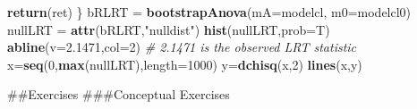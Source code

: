 \documentclass[
]{krantz}
\newenvironment{Shaded}{\begin{snugshade}}{\end{snugshade}}
\newcommand{\CommentTok}[1]{\textcolor[rgb]{0.37,0.37,0.37}{\textit{#1}}}
\newcommand{\DataTypeTok}[1]{\textcolor[rgb]{0.27,0.27,0.27}{#1}}
\newcommand{\DecValTok}[1]{\textcolor[rgb]{0.06,0.06,0.06}{#1}}
\newcommand{\FloatTok}[1]{\textcolor[rgb]{0.06,0.06,0.06}{#1}}
\newcommand{\KeywordTok}[1]{\textcolor[rgb]{0.27,0.27,0.27}{\textbf{#1}}}
\newcommand{\NormalTok}[1]{#1}
\newcommand{\StringTok}[1]{\textcolor[rgb]{0.5,0.5,0.5}{#1}}
\begin{document}
\begin{Shaded}
\begin{Highlighting}[]
     \KeywordTok{return}\NormalTok{(ret)}
\NormalTok{\}}
\NormalTok{bRLRT =}\StringTok{ }\KeywordTok{bootstrapAnova}\NormalTok{(}\DataTypeTok{mA=}\NormalTok{modelcl, }\DataTypeTok{m0=}\NormalTok{modelcl0)}
\NormalTok{nullLRT =}\StringTok{ }\KeywordTok{attr}\NormalTok{(bRLRT,}\StringTok{"nulldist"}\NormalTok{)}
\KeywordTok{hist}\NormalTok{(nullLRT,}\DataTypeTok{prob=}\NormalTok{T)}
\KeywordTok{abline}\NormalTok{(}\DataTypeTok{v=}\FloatTok{2.1471}\NormalTok{,}\DataTypeTok{col=}\DecValTok{2}\NormalTok{)  }\CommentTok{# 2.1471 is the observed LRT statistic}
\NormalTok{x=}\KeywordTok{seq}\NormalTok{(}\DecValTok{0}\NormalTok{,}\KeywordTok{max}\NormalTok{(nullLRT),}\DataTypeTok{length=}\DecValTok{1000}\NormalTok{)}
\NormalTok{y=}\KeywordTok{dchisq}\NormalTok{(x,}\DecValTok{2}\NormalTok{)}
\KeywordTok{lines}\NormalTok{(x,y)}
\end{Highlighting}
\end{Shaded}

\#\#Exercises
\#\#\#Conceptual Exercises
\end{document}
